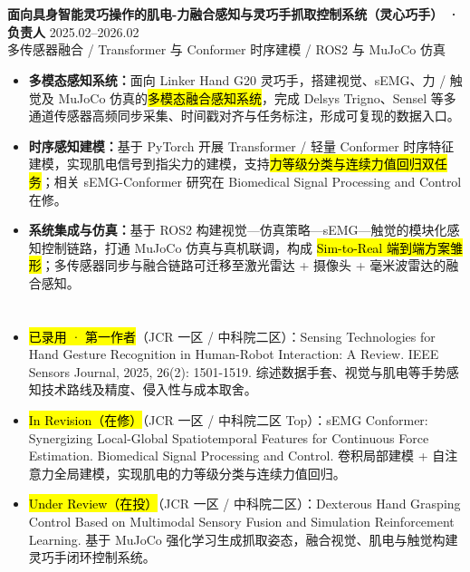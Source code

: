 \vspace{0.04em}
\section[科研与项目经历]{}
{\small\textbf{面向具身智能灵巧操作的肌电-力融合感知与灵巧手抓取控制系统（灵心巧手） · 负责人}} \hfill {2025.02--2026.02} \\
{\scriptsize\color{WHU_Blue} 多传感器融合 / Transformer 与 Conformer 时序建模 / ROS2 与 MuJoCo 仿真}
\begin{itemize}
    \item \textbf{多模态感知系统：}面向 Linker Hand G20 灵巧手，搭建视觉、sEMG、力 / 触觉及 MuJoCo 仿真的\hl{多模态融合感知系统}，完成 Delsys Trigno、Sensel 等多通道传感器高频同步采集、时间戳对齐与任务标注，形成可复现的数据入口。
    \item \textbf{时序感知建模：}基于 PyTorch 开展 Transformer / 轻量 Conformer 时序特征建模，实现肌电信号到指尖力的建模，支持\hl{力等级分类与连续力值回归双任务}；相关 sEMG-Conformer 研究在 Biomedical Signal Processing and Control 在修。
    \item \textbf{系统集成与仿真：}基于 ROS2 构建视觉—仿真策略—sEMG—触觉的模块化感知控制链路，打通 MuJoCo 仿真与真机联调，构成 \hl{Sim-to-Real 端到端方案雏形}；多传感器同步与融合链路可迁移至激光雷达 + 摄像头 + 毫米波雷达的融合感知。
\end{itemize}

\section[论文与研究成果]{}
\begin{itemize}
    \item \hl{已录用 · 第一作者}（JCR 一区 / 中科院二区）：Sensing Technologies for Hand Gesture Recognition in Human-Robot Interaction: A Review. IEEE Sensors Journal, 2025, 26(2): 1501-1519. 综述数据手套、视觉与肌电等手势感知技术路线及精度、侵入性与成本取舍。%
    \item \hl{In Revision（在修）}（JCR 一区 / 中科院二区 Top）：sEMG Conformer: Synergizing Local-Global Spatiotemporal Features for Continuous Force Estimation. Biomedical Signal Processing and Control. 卷积局部建模 + 自注意力全局建模，实现肌电的力等级分类与连续力值回归。%
    \item \hl{Under Review（在投）}（JCR 一区 / 中科院二区）：Dexterous Hand Grasping Control Based on Multimodal Sensory Fusion and Simulation Reinforcement Learning. 基于 MuJoCo 强化学习生成抓取姿态，融合视觉、肌电与触觉构建灵巧手闭环控制系统。%
\end{itemize}

